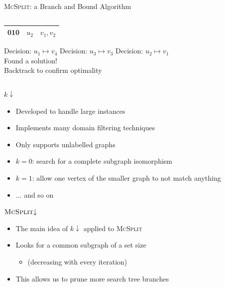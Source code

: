 \documentclass{beamer}
\begin{document}
\begin{frame}{\textsc{McSplit}: a Branch and Bound Algorithm}
\begin{columns}
\begin{column}{0.5\textwidth}
\begin{table}
\begin{overlayarea}{\textwidth}{3cm}
{\begin{tabular}{c c c}
              \midrule
              010 & $u_2$ & $v_1, v_2$ \\
              \bottomrule
            \end{tabular}
          }
        \end{overlayarea}
      \end{table}
      \begin{overprint}
        Decision: $u_1 \mapsto v_4$
        Decision: $u_3 \mapsto v_3$
        Decision: $u_2 \mapsto v_1$\\ Found a solution! \\ Backtrack to confirm optimality
      \end{overprint}
    \end{column}
  \end{columns}
\end{frame}

\begin{frame}{$k{\downarrow}$}
  \begin{itemize}
  \item Developed to handle large instances
  \item Implements many domain filtering techniques
  \item Only supports unlabelled graphs
  \item $k = 0$: search for a complete subgraph isomorphism
  \item $k = 1$: allow one vertex of the smaller graph to not match anything
  \item ... and so on
  \end{itemize}
\end{frame}

\begin{frame}{$\textsc{McSplit}{\downarrow}$}
  \begin{itemize}
  \item The main idea of $k{\downarrow}$ applied to \textsc{McSplit}
  \item Looks for a common subgraph of a set size
    \begin{itemize}
    \item (decreasing with every iteration)
    \end{itemize}
  \item This allows us to prune more search tree branches
  \end{itemize}
\end{frame}
\end{document}
